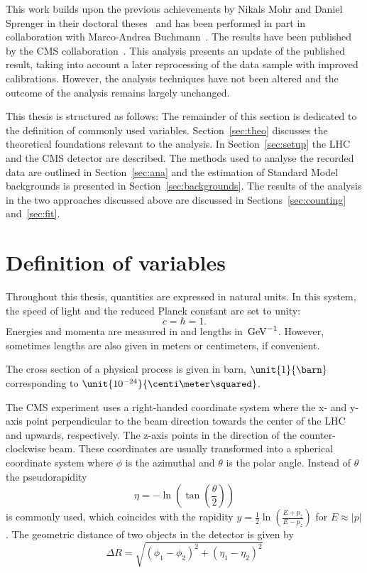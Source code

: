 This work builds upon the previous achievements by Nikals Mohr and Daniel Sprenger in their doctoral theses~\cite{Mohr:1423334,Sprenger:1501963} and has been performed in part in collaboration with Marco-Andrea Buchmann~\cite{Buchmann:1704399}. The results have been published by the CMS collaboration~\cite{Khachatryan:2015lwa}. This analysis presents an update of the published result, taking into account a later reprocessing of the data sample with improved calibrations. However, the analysis techniques have not been altered and the outcome of the analysis remains largely unchanged.

This thesis is structured as follows: The remainder of this section is dedicated to the definition of commonly used variables. Section~\ref{sec:theo} discusses the theoretical foundations relevant to the analysis. In Section~\ref{sec:setup} the LHC and the CMS detector are described. The methods used to analyse the recorded data are outlined in Section~\ref{sec:ana} and the estimation of Standard Model backgrounds is presented in Section~\ref{sec:backgrounds}. The results of the analysis in the two approaches discussed above are discussed in Sections~\ref{sec:counting} and~\ref{sec:fit}. 

\section{Definition of variables}
\label{sec:variables}
Throughout this thesis, quantities are expressed in natural units. In this system, the speed of light and the reduced Planck constant are set to unity:
\begin{equation}
c = \hbar = 1.
\end{equation} 
Energies and momenta are measured in \GeV and lengths in $\text{\ensuremath{\,\mathrm{Ge\hspace{-.08em}V}}}^{-1}$. However, sometimes lengths are also given in meters or centimeters, if convenient. 

The cross section of a physical process is given in barn, $\unit{1}{\barn}$ corresponding to $\unit{10^{-24}}{\centi\meter\squared}$.   

The CMS experiment uses a right-handed coordinate system where the x- and y-axis point perpendicular to the beam direction towards the center of the LHC and upwards, respectively. The z-axis points in the direction of the counter-clockwise beam.  These coordinates are usually transformed into a spherical coordinate system where $\phi$ is the azimuthal and $\theta$ is the polar angle. Instead of $\theta$ the pseudorapidity 
\begin{equation}
\eta = -\ln \left( \tan\left(\frac{\theta}{2}\right)\right)
\end{equation}
is commonly used, which coincides with the rapidity $y = \frac{1}{2} \ln\left(\frac{E+p_z}{E-p_z}\right)$ for $E\approx |p|$. The geometric distance of two objects in the detector is given by
\begin{equation}
\Delta R = \sqrt{(\phi_1 - \phi_2)^2 + (\eta_1 - \eta_2)^2}
\end{equation}

